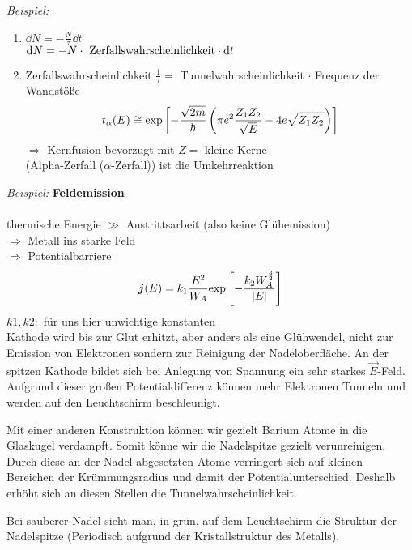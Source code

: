 \emph{Beispiel:}
\begin{enumerate}[1)]
	\item $ \dd N = - \frac{N}{\tau} \dd t $\\
	$ \textrm{d} N = - N \cdot \textrm{ Zerfallswahrscheinlichkeit} \cdot \textrm{d} t $
	\item Zerfallswahrscheinlichkeit $ \frac{1}{\tau} = $ Tunnelwahrscheinlichkeit $ \cdot $ Frequenz der Wandstöße\\
	\begin{equation*}
	t_{\alpha}(E) \cong \textrm{exp} \left[-\frac{\sqrt{2 m}}{\hbar} \left(\pi e^2 \frac{Z_1 Z_2}{\sqrt{E}} - 4 e \sqrt{Z_1 Z_2}\right)\right]
	\end{equation*}
	$ \Rightarrow $ Kernfusion bevorzugt mit $ Z = $ kleine Kerne\\
	(Alpha-Zerfall ($ \alpha $-Zerfall)) ist die Umkehrreaktion 
\end{enumerate}
\emph{Beispiel:} \textbf{Feldemission}\\[5pt]
\\
thermische Energie $ \gg $ Austrittsarbeit (also keine Glühemission)\\
$ \Rightarrow $ Metall ins starke Feld\\
$ \Rightarrow $ Potentialbarriere
\begin{equation*}
\bm{j}(E) = k_1 \frac{E^2}{W_A} \textrm{exp} \left[- \frac{k_2 W_{A}^{\frac{3}{2}}}{|E|}\right]
\end{equation*}
$ k1, k2 : $ für uns hier unwichtige konstanten\\
\indent Kathode wird bis zur Glut erhitzt, aber anders als eine Glühwendel, nicht zur Emission von Elektronen sondern zur Reinigung der Nadeloberfläche. An der spitzen Kathode bildet sich bei Anlegung von Spannung ein sehr starkes $ \vec{E} $-Feld. Aufgrund dieser großen Potentialdifferenz können mehr Elektronen Tunneln und werden auf den Leuchtschirm beschleunigt.

Mit einer anderen Konstruktion können wir gezielt Barium Atome in die Glaskugel verdampft. Somit könne wir die Nadelspitze gezielt verunreinigen. Durch diese an der Nadel abgesetzten Atome verringert sich auf kleinen Bereichen der Krümmungsradius und damit der Potentialunterschied. Deshalb erhöht sich an diesen Stellen die Tunnelwahrscheinlichkeit.

Bei sauberer Nadel sieht man, in grün, auf dem Leuchtschirm die Struktur der Nadelspitze (Periodisch aufgrund der Kristallstruktur des Metalls).


